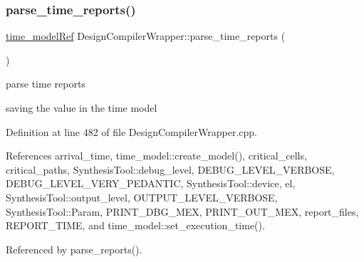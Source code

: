\subsubsection{\texorpdfstring{parse\+\_\+time\+\_\+reports()}{parse\_time\_reports()}}
{\footnotesize\ttfamily \hyperlink{time__model_8hpp_ae203bb7faf1c278333f76fcc6ebe412c}{time\+\_\+model\+Ref} Design\+Compiler\+Wrapper\+::parse\+\_\+time\+\_\+reports (\begin{DoxyParamCaption}{ }\end{DoxyParamCaption})}



parse time reports 

saving the value in the time model 

Definition at line 482 of file Design\+Compiler\+Wrapper.\+cpp.



References arrival\+\_\+time, time\+\_\+model\+::create\+\_\+model(), critical\+\_\+cells, critical\+\_\+paths, Synthesis\+Tool\+::debug\+\_\+level, D\+E\+B\+U\+G\+\_\+\+L\+E\+V\+E\+L\+\_\+\+V\+E\+R\+B\+O\+SE, D\+E\+B\+U\+G\+\_\+\+L\+E\+V\+E\+L\+\_\+\+V\+E\+R\+Y\+\_\+\+P\+E\+D\+A\+N\+T\+IC, Synthesis\+Tool\+::device, el, Synthesis\+Tool\+::output\+\_\+level, O\+U\+T\+P\+U\+T\+\_\+\+L\+E\+V\+E\+L\+\_\+\+V\+E\+R\+B\+O\+SE, Synthesis\+Tool\+::\+Param, P\+R\+I\+N\+T\+\_\+\+D\+B\+G\+\_\+\+M\+EX, P\+R\+I\+N\+T\+\_\+\+O\+U\+T\+\_\+\+M\+EX, report\+\_\+files, R\+E\+P\+O\+R\+T\+\_\+\+T\+I\+ME, and time\+\_\+model\+::set\+\_\+execution\+\_\+time().



Referenced by parse\+\_\+reports().

